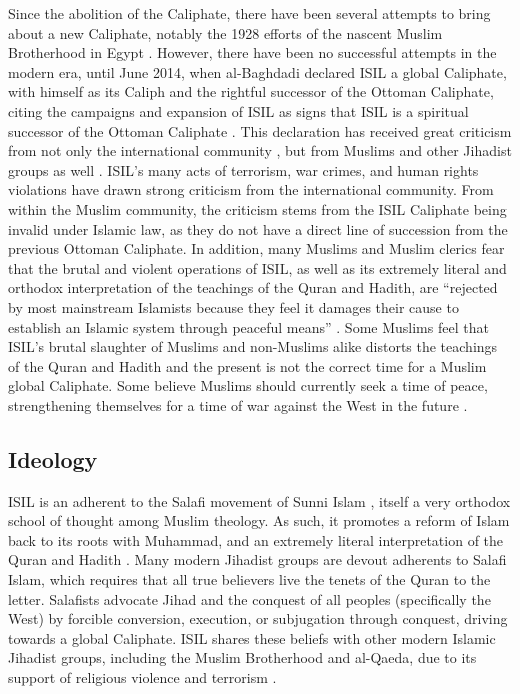 \documentclass{report}
\begin{document}
Since the abolition of the Caliphate, there have been several attempts to bring about a new Caliphate, notably the  1928 efforts of the nascent Muslim Brotherhood in Egypt \cite{Tolson2008,gabriel2008they}. However, there have been no successful attempts in the modern era, until  June 2014, when al-Baghdadi declared ISIL a global Caliphate, with himself as its Caliph and the rightful successor of the Ottoman Caliphate, citing the campaigns and expansion of ISIL as signs that ISIL is a spiritual successor of the Ottoman Caliphate \cite{Mortada2014,TheWeek2014}.  This declaration has received great criticism from not only the international community \cite{Gomes2007}, but from Muslims and other Jihadist groups as well \cite{Mandhai2014,Moore2014}. ISIL's many acts of terrorism, war crimes, and human rights violations have drawn strong criticism from the international community. From within the Muslim community, the criticism stems from the ISIL Caliphate being invalid under Islamic law, as they do not have a direct line of succession from the previous Ottoman Caliphate. In addition, many Muslims and Muslim clerics fear that the brutal and violent operations of ISIL, as well as its extremely literal and orthodox interpretation of the teachings of  the Quran and Hadith, are \enquote{rejected by most mainstream Islamists because they feel it damages their cause to establish an Islamic system through peaceful means} \cite{Mandhai2014}. Some Muslims feel that ISIL's brutal slaughter of Muslims and non-Muslims alike distorts the teachings of the Quran and Hadith and the present is not the correct time for a Muslim global Caliphate. Some believe Muslims  should currently seek a time of peace, strengthening themselves for a time of war against the West in the future \cite{schmidt2004great,Moore2014,Wood2015}.

    


    \subsection{Ideology}
    
    ISIL is an adherent to the Salafi movement of Sunni Islam \cite{Bradley2015}, itself a very orthodox school of thought among Muslim theology.  As such, it promotes a reform of Islam back to its roots with Muhammad, and an extremely literal interpretation of the Quran and Hadith \cite{Hassan2015}. Many modern Jihadist groups are devout adherents to Salafi Islam, which requires that all true believers live the tenets of the Quran to the letter. Salafists  advocate Jihad and the conquest of all peoples (specifically the West) by forcible conversion, execution, or subjugation through conquest, driving towards a global Caliphate. ISIL shares these beliefs with other modern Islamic Jihadist groups, including the Muslim Brotherhood and al-Qaeda, due to its support of religious violence and terrorism \cite{schmidt2004great,gabriel2008they,Hassan2015,Moussalli2009}.
    
\end{document}
